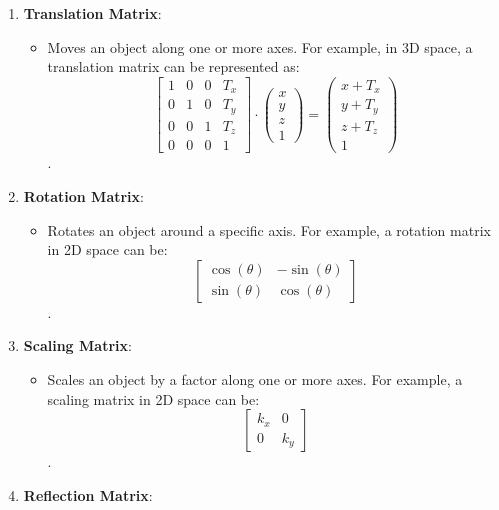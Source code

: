 \documentclass[11pt]{article}
\providecommand{\tightlist}{%
      \setlength{\itemsep}{0pt}\setlength{\parskip}{0pt}}
\begin{document}
\begin{enumerate}
\def\labelenumi{\arabic{enumi}.}
\tightlist
\item
  \textbf{Translation Matrix}:

  \begin{itemize}
  \tightlist
  \item
    Moves an object along one or more axes. For example, in 3D space, a
    translation matrix can be represented as: \[
    \begin{bmatrix}
    1 & 0 & 0 & T_x \\
    0 & 1 & 0 & T_y \\
    0 & 0 & 1 & T_z \\
    0 & 0 & 0 & 1
    \end{bmatrix}
    \cdot
    \begin{pmatrix}
    x \\ y \\ z \\ 1
    \end{pmatrix}
    =
    \begin{pmatrix}
    x + T_x \\ y + T_y \\ z + T_z \\ 1
    \end{pmatrix}
    \] .
  \end{itemize}
\item
  \textbf{Rotation Matrix}:

  \begin{itemize}
  \tightlist
  \item
    Rotates an object around a specific axis. For example, a rotation
    matrix in 2D space can be: \[
    \begin{bmatrix}
    \cos(\theta) & -\sin(\theta) \\
    \sin(\theta) & \cos(\theta)
    \end{bmatrix}
    \] .
  \end{itemize}
\item
  \textbf{Scaling Matrix}:

  \begin{itemize}
  \tightlist
  \item
    Scales an object by a factor along one or more axes. For example, a
    scaling matrix in 2D space can be: \[
    \begin{bmatrix}
    k_x & 0 \\
    0 & k_y
    \end{bmatrix}
    \] .
  \end{itemize}
\item
  \textbf{Reflection Matrix}:


\end{enumerate}
\end{document}

